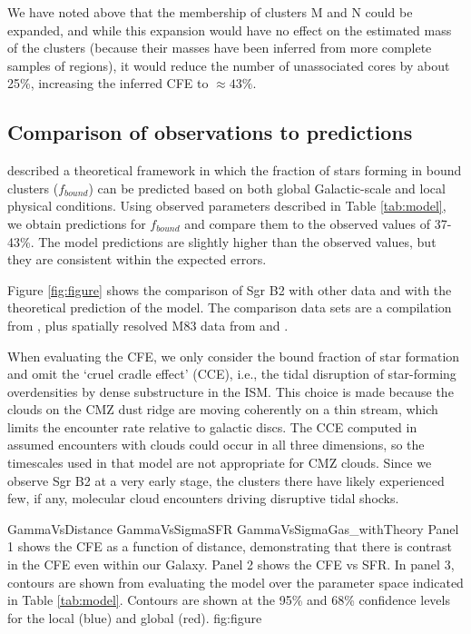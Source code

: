 \documentclass[twocolumn]{aastex61}
\begin{document}
We have noted above that the membership of clusters M and N could be expanded,
and while this expansion would have no effect on the estimated mass of the clusters
(because their masses have been inferred from more complete samples of \hii regions),
it would reduce the number of unassociated cores by about 25\%, increasing the inferred
CFE to $\approx43\%$. %

\subsection{Comparison of observations to predictions}
\citet{Kruijssen2012a} described a theoretical framework in which the fraction
of stars forming in bound clusters ($f_{bound}$) can be predicted based on both
global Galactic-scale and local physical conditions.  Using observed parameters
described in Table \ref{tab:model}, we obtain predictions for $f_{bound}$ and
compare them to the observed values of 37-43\%.  The model predictions are
slightly higher than the observed values, but they are consistent within the expected
errors.

Figure \ref{fig:figure} shows the comparison of Sgr B2 with other data and with
the theoretical prediction of the \citet{Kruijssen2012a} model.  The comparison
data sets are a compilation from \citet{Adamo2015a}, plus spatially resolved
M83 data from \citet{Freeman2017a} and \citet{Adamo2015a}.

When evaluating the CFE, we only consider the bound fraction of star formation
and omit the `cruel cradle effect' (CCE), i.e., the tidal disruption of
star-forming overdensities by dense substructure in the ISM. This choice is
made because the clouds on the CMZ dust ridge are moving coherently on a thin
stream, which limits the encounter rate relative to galactic discs.  The CCE
computed in \citet{Kruijssen2012a} assumed encounters with clouds could occur
in all three dimensions, so the timescales used in that model are not
appropriate for CMZ clouds.  Since we observe Sgr B2 at a very early stage, the
clusters there have likely experienced few, if any, molecular cloud encounters
driving disruptive tidal shocks.

\FigureThreePDF
{GammaVsDistance}
{GammaVsSigmaSFR}
{GammaVsSigmaGas_withTheory}
{Panel 1 shows the CFE as a function of distance, demonstrating that there is
contrast in the CFE even within our Galaxy.
Panel 2 shows the CFE vs SFR.
In panel 3, contours are shown from evaluating the \citet{Kruijssen2012a} model
over the parameter space indicated in Table \ref{tab:model}.  Contours are shown
at the 95\% and 68\% confidence levels for the local (blue) and global (red).
}
{fig:figure}





\end{document}
